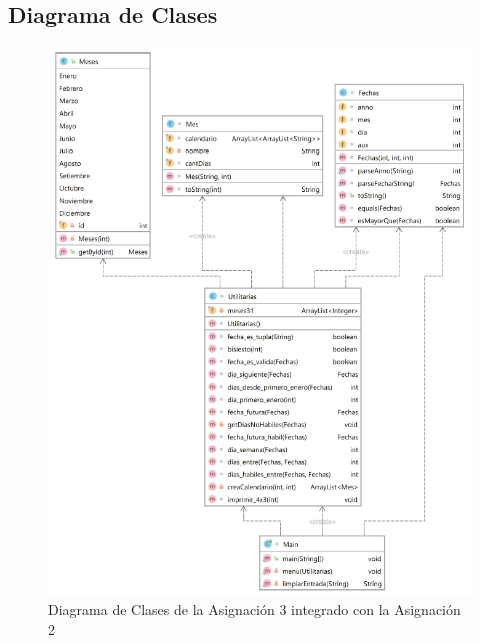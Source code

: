 \documentclass[10pt,journal,compsoc]{IEEEtran}
\begin{document}
\subsection{Diagrama de Clases}
\begin{figure}
	\centering
	\includegraphics[width=\linewidth]{diagramaClases.png}
	\caption{Diagrama de Clases de la Asignación 3 integrado con la Asignación 2}
\end{figure}
	
\end{document}

